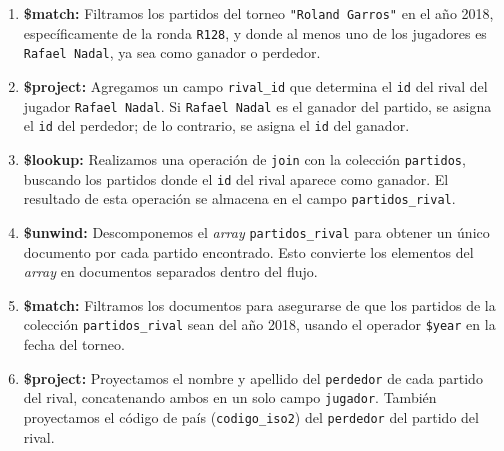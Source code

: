 \begin{enumerate}
    \item \textbf{\$match:} Filtramos los partidos del torneo \texttt{"Roland Garros"} en el año 2018, específicamente de la ronda \texttt{R128}, y donde al menos uno de los jugadores es \texttt{Rafael Nadal}, ya sea como ganador o perdedor.
    \item \textbf{\$project:} Agregamos un campo \texttt{rival\_id} que determina el \texttt{id} del rival del jugador \texttt{Rafael Nadal}. Si \texttt{Rafael Nadal} es el ganador del partido, se asigna el \texttt{id} del perdedor; de lo contrario, se asigna el \texttt{id} del ganador.
    
    \item \textbf{\$lookup:} Realizamos una operación de \texttt{join} con la colección \texttt{partidos}, buscando los partidos donde el \texttt{id} del rival aparece como ganador. El resultado de esta operación se almacena en el campo \texttt{partidos\_rival}.
    
    \item \textbf{\$unwind:} Descomponemos el \textit{array} \texttt{partidos\_rival} para obtener un único documento por cada partido encontrado. Esto convierte los elementos del \textit{array} en documentos separados dentro del flujo.
    \item \textbf{\$match:} Filtramos los documentos para asegurarse de que los partidos de la colección \texttt{partidos\_rival} sean del año 2018, usando el operador \texttt{\$year} en la fecha del torneo.
    \item \textbf{\$project:} Proyectamos el nombre y apellido del \texttt{perdedor} de cada partido del rival, concatenando ambos en un solo campo \texttt{jugador}. También proyectamos el código de país (\texttt{codigo\_iso2}) del \texttt{perdedor} del partido del rival.
\end{enumerate}

